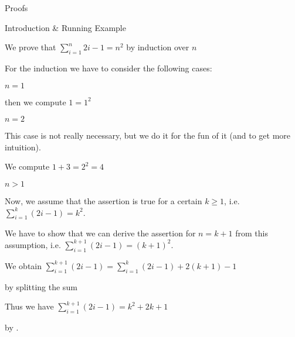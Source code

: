 \begin{sfragment}{Proofs}
\begin{sfragment}{Introduction \& Running Example}
\begin{mdframed}
  \begin{sproof}[id=simple-proof]
  {We prove that $\sum_{i=1}^n{2i-1}=n^{2}$ by induction over $n$}
  \begin{spfcases}{For the induction we have to consider the following cases:}
    \begin{spfcase}{$n=1$}
      \begin{spfstep}[type=inline] then we compute $1=1^2$\end{spfstep}
    \end{spfcase}
    \begin{spfcase}{$n=2$}
      \begin{spfcomment}[type=inline]
         This case is not really necessary, but we do it for the fun
         of it (and to get more intuition).
      \end{spfcomment}
      \begin{spfstep}[type=inline]
         We compute $1+3=2^{2}=4$
      \end{spfstep}
    \end{spfcase}
    \begin{spfcase}{$n>1$}
      \begin{spfstep}[type=hypothesis,id=ind-hyp]
        Now, we assume that the assertion is true for a certain $k\geq 1$, i.e.
        $\sum_{i=1}^k{(2i-1)}=k^{2}$.
      \end{spfstep}
      \begin{spfcomment}
        We have to show that we can derive the assertion for $n=k+1$ from this
        assumption, i.e.  $\sum_{i=1}^{k+1}{(2i-1)}=(k+1)^{2}$.
      \end{spfcomment}
      \begin{spfstep}[id=splitit]
        We obtain $\sum_{i=1}^{k+1}{(2i-1)}=\sum_{i=1}^k{(2i-1)}+2(k+1)-1$
       \begin{justification}[method=arith:split-sum]
         by splitting the sum
       \end{justification}
     \end{spfstep}
     \begin{spfstep}[id=byindhyp]
       Thus we have $\sum_{i=1}^{k+1}{(2i-1)}=k^2+2k+1$
       \begin{justification}[method=fertilize]
         by .
       \end{justification}
     \end{spfstep}
     \begin{spfstep}[type=conclusion]

\end{spfstep}
\end{spfcase}
\end{spfcases}
\end{sproof}
\end{mdframed}
\end{sfragment}
\end{sfragment}
